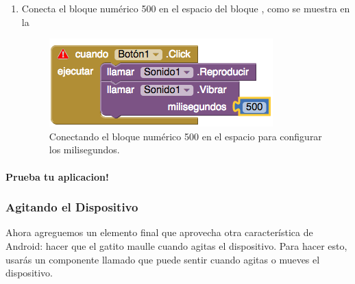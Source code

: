 \documentclass[letterpaper]{article}
\begin{document}
\begin{enumerate}
\item Conecta el bloque numérico 500 en el espacio del bloque
  , como se muestra en
  la~

\begin{figure}[H]
\centering
\includegraphics[scale=0.25]{figures/button1ClickPlayVibrateMillis4}
\caption{Conectando el bloque numérico 500 en el espacio para
  configurar los milisegundos.}
\label{fig:button1ClickPlayVibrateMillis4}
\end{figure}

\end{enumerate}

\paragraph{Prueba tu aplicacion!}

\subsubsection*{Agitando el Dispositivo}

Ahora agreguemos un elemento final que aprovecha otra característica
de Android: hacer que el gatito maulle cuando agitas el
dispositivo. Para hacer esto, usarás un componente llamado
 que puede sentir cuando agitas o mueves el
dispositivo.
\end{document}
